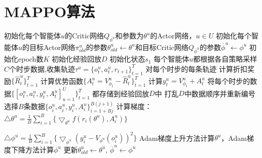 \documentclass[11pt]{ctexart}
\begin{document}
\section{MAPPO算法}
\begin{algorithm}[H] %
	\renewcommand{\thealgorithm}{} %
	\caption{} 
	\begin{algorithmic}[1] %
		\STATE 初始化每个智能体$u$的Critic网络$Q_{\phi^u}$和参数为$\theta^u$的Actor网络，$u \in U$
		\STATE 初始化每个智能体$u$的目标Actor网络$\pi_{old}^u$的参数$\theta_{old}^u\leftarrow\theta^u$和目标Critic网络$Q_{\overline{\phi}^u}$的参数$\overline{\phi}^u\leftarrow\phi^u$
		\STATE 初始化epoch数$K$
		\STATE 初始化经验回放$D$
			\STATE 初始化状态$s_1$
			\STATE 每个智能体$u$都根据各自策略采样$C$个时步数据,收集轨迹$\tau^u = {\{o_t^u, a_t^u, r_{t+1}}\}_{t=1}^T$
			\STATE 对每个时步的每条轨迹
			\STATE 计算折扣奖励$\{\hat{R}_t^u\}_{t=1}^T$
			\STATE 计算优势函数$\{A_t^u=V_{\phi_t}^u-\hat{R}_t^u\}_{t=1}^T$
			\STATE 计算$y_t^u=V_{\phi_t}^u+A_t^u$
			\STATE 将每个时步的数据$\{[o_t^u, a_t^u, y_t^u, A_t^u]_{u=1}^U\}_{t=1}^T$ 都存储到经验回放$D$中
				\STATE 打乱$D$中数据顺序并重新编号
					\STATE 选择$B$条数据$\{o_i^u, a_i^u, y_i^u, A_i^u\}_{i=1+Bj}^{B(j+1)}$
					\STATE 计算梯度：
					\STATE $\bigtriangleup\theta^u=\frac{1}{B}\sum_{i=1}^B\{\bigtriangledown_{\theta^u}f(r_i(\theta^u),A_i^u)\}$
					
					\STATE $\bigtriangleup\phi^u=\frac{1}{B}\sum_{i=1}^B\{\bigtriangledown_{\phi^u}(y_i^u-V_{\phi^u}(o_i^u))^2\}$
					\STATE Adam梯度上升方法计算$\theta^u$，Adam梯度下降方法计算$\phi^u$
				\ENDFOR
			\ENDFOR
		\STATE 更新$\theta_{old}^u\leftarrow\theta^u$, $\overline{\phi}^u\leftarrow\phi^u$
		\ENDFOR
	\end{algorithmic}
\end{algorithm}
\clearpage
\end{document}
